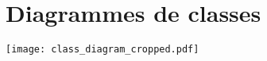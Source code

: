 

\chapter{Diagrammes de classes}
	\label{s:classes}
	\addtolength{\evensidemargin}{-1in}	
\texttt{[image: class\_diagram\_cropped.pdf]}
